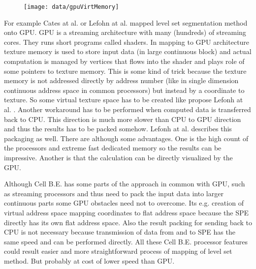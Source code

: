 \begin{figure}
    \centering
    \texttt{[image: data/gpuVirtMemory]}
    \caption[Leaking of segmentation into unwanted places]{}
    \label{fg:virtual memory on GPU}
\end{figure}

\par
For example Cates at al. \cite{GIST} or Lefohn at al. \cite{lefonhGPUSolver} mapped level set segmentation method onto GPU.
GPU is a streaming architecture with many (hundreds) of streaming cores. They runs short programs called shaders.
In mapping to GPU architecture texture memory is used to store input data (in large continuous block) and actual computation is managed by vertices that flows into the shader and plays role of some pointers to texture memory.
This is some kind of trick because the texture memory is not addressed directly by address number (like in single dimension continuous address space in common processors) but instead by a coordinate to texture.
So some virtual texture space has to be created like propose Lefonh at al. \cite{lefonhGPUSolver}.
Another workaround has to be performed when computed data is transferred back to CPU.
This direction is much more slower than CPU to GPU direction and thus the results has to be packed somehow.
Lefonh at al. \cite{lefonhGPUSolver} describes this packaging as well.
There are although some advantages.
One is the high count of the processors and extreme fast dedicated memory so the results can be impressive.
Another is that the calculation can be directly visualized by the GPU.

\par
Although Cell B.E. has some parts of the approach in common with GPU, such as streaming processors and thus need to pack the input data into larger continuous parts some GPU obstacles need not to overcome.
Its e.g. creation of virtual address space mapping coordinates to flat address space because the SPE directly has its own flat address space.
Also the result packing for sending back to CPU is not necessary because transmission of data from and to SPE has the same speed and can be performed directly.
All these Cell B.E. processor features could result easier and more straightforward process of mapping of level set method.
But probably at cost of lower speed than GPU.